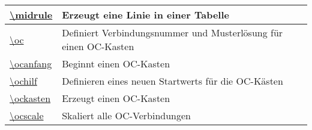 \documentclass[./main.tex]{subfiles}
\begin{document}
\begin{tabularx}{\linewidth}{|l|X|}
    \hyperlink{midrule}{\textbackslash{}midrule}&Erzeugt eine Linie in einer Tabelle\\\hline
    \hyperlink{oc}{\textbackslash{}oc}&Definiert Verbindungsnummer und Musterl\"osung f\"ur einen OC-Kasten\\\hline
    \hyperlink{ocanfang}{\textbackslash{}ocanfang}&Beginnt einen OC-Kasten\\\hline
    \hyperlink{ochilf}{\textbackslash{}ochilf}&Definieren eines neuen Startwerts f\"ur die OC-K\"asten\\\hline
    \hyperlink{ockasten}{\textbackslash{}ockasten}&Erzeugt einen OC-Kasten\\\hline
    \hyperlink{ocscale}{\textbackslash{}ocscale}&Skaliert alle OC-Verbindungen\\\hline
\end{tabularx}
\end{document}
